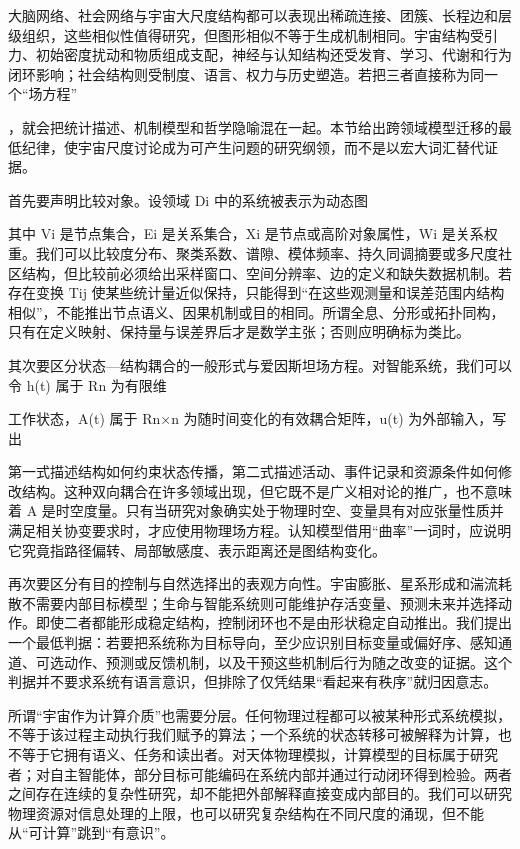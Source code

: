 \label{sec:section_9673}

大脑网络、社会网络与宇宙大尺度结构都可以表现出稀疏连接、团簇、长程边和层级组织，这些相似性值得研究，但图形相似不等于生成机制相同。宇宙结构受引力、初始密度扰动和物质组成支配，神经与认知结构还受发育、学习、代谢和行为闭环影响；社会结构则受制度、语言、权力与历史塑造。若把三者直接称为同一个“场方程”

，就会把统计描述、机制模型和哲学隐喻混在一起。本节给出跨领域模型迁移的最低纪律，使宇宙尺度讨论成为可产生问题的研究纲领，而不是以宏大词汇替代证据。

首先要声明比较对象。设领域 Di 中的系统被表示为动态图

其中 Vi 是节点集合，Ei 是关系集合，Xi 是节点或高阶对象属性，Wi 是关系权重。我们可以比较度分布、聚类系数、谱隙、模体频率、持久同调摘要或多尺度社区结构，但比较前必须给出采样窗口、空间分辨率、边的定义和缺失数据机制。若存在变换 Tij 使某些统计量近似保持，只能得到“在这些观测量和误差范围内结构相似”，不能推出节点语义、因果机制或目的相同。所谓全息、分形或拓扑同构，只有在定义映射、保持量与误差界后才是数学主张；否则应明确标为类比。

其次要区分状态—结构耦合的一般形式与爱因斯坦场方程。对智能系统，我们可以令 h(t) 属于 Rn 为有限维

工作状态，A(t) 属于 Rn×n 为随时间变化的有效耦合矩阵，u(t) 为外部输入，写出

第一式描述结构如何约束状态传播，第二式描述活动、事件记录和资源条件如何修改结构。这种双向耦合在许多领域出现，但它既不是广义相对论的推广，也不意味着 A 是时空度量。只有当研究对象确实处于物理时空、变量具有对应张量性质并满足相关协变要求时，才应使用物理场方程。认知模型借用“曲率”一词时，应说明它究竟指路径偏转、局部敏感度、表示距离还是图结构变化。

再次要区分有目的控制与自然选择出的表观方向性。宇宙膨胀、星系形成和湍流耗散不需要内部目标模型；生命与智能系统则可能维护存活变量、预测未来并选择动作。即使二者都能形成稳定结构，控制闭环也不是由形状稳定自动推出。我们提出一个最低判据：若要把系统称为目标导向，至少应识别目标变量或偏好序、感知通道、可选动作、预测或反馈机制，以及干预这些机制后行为随之改变的证据。这个判据并不要求系统有语言意识，但排除了仅凭结果“看起来有秩序”就归因意志。

所谓“宇宙作为计算介质”也需要分层。任何物理过程都可以被某种形式系统模拟，不等于该过程主动执行我们赋予的算法；一个系统的状态转移可被解释为计算，也不等于它拥有语义、任务和读出者。对天体物理模拟，计算模型的目标属于研究者；对自主智能体，部分目标可能编码在系统内部并通过行动闭环得到检验。两者之间存在连续的复杂性研究，却不能把外部解释直接变成内部目的。我们可以研究物理资源对信息处理的上限，也可以研究复杂结构在不同尺度的涌现，但不能从“可计算”跳到“有意识”。

